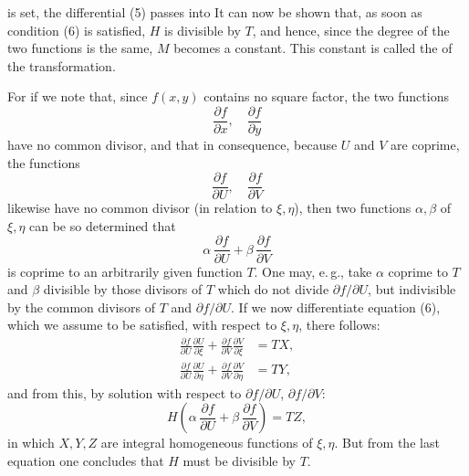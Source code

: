 is set, the differential (5) passes into
It can now be shown that, as soon as condition (6) is satisfied, $H$ is
divisible by $T$, and hence, since the degree of the two functions is the
same, $M$ becomes a constant. This constant is called
the  of the transformation.

For if we note that, since $f(x,y)$ contains no square factor, the two
functions
\[
\frac{\partial f}{\partial x}, \quad \frac{\partial f}{\partial y}
\]
have no common divisor, and that in consequence, because $U$ and $V$ are
coprime, the functions
\[
\frac{\partial f}{\partial U}, \quad \frac{\partial f}{\partial V}
\]
likewise have no common divisor (in relation to $\xi,\eta$), then two
functions $\alpha,\beta$ of $\xi,\eta$ can be so determined that
\[
\alpha\,\frac{\partial f}{\partial U} + \beta\,\frac{\partial f}{\partial V}
\]
is coprime to an arbitrarily given function $T$. One may, e.\,g., take
$\alpha$ coprime to $T$ and $\beta$ divisible by those divisors of $T$
which do not divide $\partial f/\partial U$, but indivisible by the
common divisors of $T$ and $\partial f/\partial U$. If we now
differentiate equation (6), which we assume to be satisfied, with respect
to $\xi,\eta$, there follows:
\[
\begin{aligned}
\frac{\partial f}{\partial U}\frac{\partial U}{\partial \xi} + \frac{\partial f}{\partial V}\frac{\partial V}{\partial \xi} &= TX,\\
\frac{\partial f}{\partial U}\frac{\partial U}{\partial \eta} + \frac{\partial f}{\partial V}\frac{\partial V}{\partial \eta} &= TY,
\end{aligned}
\]
and from this, by solution with respect to $\partial f/\partial U$,
$\partial f/\partial V$:
\[
H\left(\alpha\,\frac{\partial f}{\partial U} + \beta\,\frac{\partial f}{\partial V}\right) = TZ,
\]
in which $X,Y,Z$ are integral homogeneous functions of $\xi,\eta$. But
from the last equation one concludes that $H$ must be divisible by $T$.
